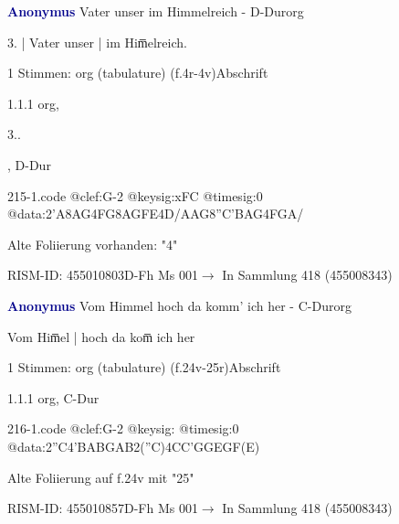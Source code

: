 \documentclass[twocolumn, 12pt]{book}
\begin{document}
\par \vspace{16pt} \textcolor{darkblue}{\textbf{Anonymus  }}\hfillplus{\textbf{[215]}}\newline Vater unser im Himmelreich - D-Dur\newline org
\par \begin{itshape}[f.4r, at left:] 3. | Vater unser | im Him̅elreich.\end{itshape} 
\par \textcolor{darkblue}{}  1 Stimmen: org (tabulature)  (f.4r-4v)\newline Abschrift
\par 1.1.1  org, \begin{itshape}3..\end{itshape}, D-Dur  
\begin{filecontents*}{215-1.code}
@clef:G-2
@keysig:xFC
@timesig:0
@data:2'A{8AG}4FG{8AG}{FE}4D/AAG{8''C'BAG}4FGA/
\end{filecontents*}
\newline %
\par Alte Foliierung vorhanden: "4"
\par RISM-ID: 455010803\newline D-Fh  Ms 001\newline $\rightarrow$ In Sammlung 418 (455008343)
      
\par \vspace{16pt} \textcolor{darkblue}{\textbf{Anonymus  }}\hfillplus{\textbf{[216]}}\newline Vom Himmel hoch da komm' ich her - C-Dur\newline org
\par \begin{itshape}[f.24v, at left:] Vom Him̅el | hoch da kom̅ ich her\end{itshape} 
\par \textcolor{darkblue}{}  1 Stimmen: org (tabulature)  (f.24v-25r)\newline Abschrift
\par 1.1.1  org, C-Dur  
\begin{filecontents*}{216-1.code}
@clef:G-2
@keysig:
@timesig:0
@data:2''C4'BABGAB2(''C)4CC'GGEGF(E)
\end{filecontents*}
\newline %
\par Alte Foliierung auf f.24v mit "25"
\par RISM-ID: 455010857\newline D-Fh  Ms 001\newline $\rightarrow$ In Sammlung 418 (455008343)
      
\end{document}

